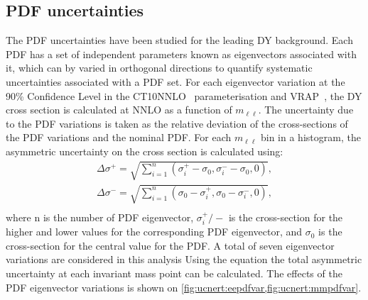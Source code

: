 \subsection{PDF uncertainties}
The PDF uncertainties have been studied for the leading DY background. Each PDF has a set of independent parameters known as eigenvectors associated with it, which can by varied in orthogonal directions to quantify systematic uncertainties associated with a PDF set. For each eigenvector variation at the 90\% Confidence Level in the CT10NNLO~\cite{ct10} parameterisation and {\textsc{VRAP}}~\cite{vrap}, the DY cross section is calculated at NNLO as a function of $m_{\ell\ell}$. The uncertainty due to the PDF variations is taken as the relative deviation of the cross-sections of the PDF variations and the nominal PDF. For each $m_{\ell\ell}$ bin in a histogram, the asymmetric uncertainty on the cross section is calculated using:
\begin{equation}
    \begin{aligned}
    \Delta \sigma^+ = \sqrt{\sum^n_{i=1}\left(\sigma_i^+ - \sigma_0, \sigma^-_i - \sigma_0,0     \right)}, \\
    \Delta \sigma^- = \sqrt{\sum^n_{i=1}\left(\sigma_0 - \sigma_i^+, \sigma_0 -\sigma^-_i,0  \right)}, \\
    \end{aligned}
\end{equation}
where n is the number of PDF eigenvector, $\sigma_i^+/-$ is the cross-section for the higher and lower values for the corresponding PDF eigenvector, and $\sigma_0$ is the cross-section for the central value for the PDF. A total of seven eigenvector variations are considered in this analysis Using the equation the total asymmetric uncertainty at each invariant mass point can be calculated. The effects of the PDF eigenvector variations is shown on \cref{fig:ucnert:eepdfvar,fig:ucnert:mmpdfvar}.

